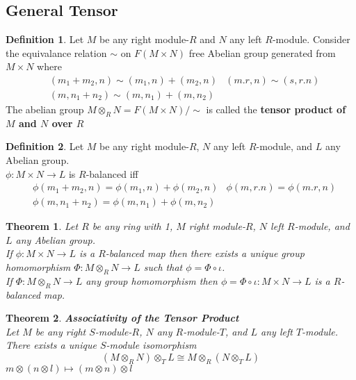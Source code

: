 \documentclass{article}
\theoremstyle{plain}
\newtheorem{thm}{Theorem}[section]
\theoremstyle{definition}
\newtheorem{defn}{Definition}[section]
\theoremstyle{remark}
\begin{document}
  \subsection{General Tensor}
  \begin{defn}
    Let $M$ be any right module-$R$ and $N$ any left $R$-module. Consider the
    equivalance relation $\sim$ on $F(M\times N)$ free Abelian group generated from
    $M\times N$ where
  \begin{align*}
    &(m_1+m_2,n)\sim(m_1,n) + (m_2,n)
    &(m.r,n)\sim(s,r.n) \\
    &(m,n_1+n_2)\sim(m,n_1)+(m,n_2)
  \end{align*}
  The abelian group $M\otimes_RN=F(M\times N)/\sim$ is called the \textbf{tensor product of $M$ and $N$ over $R$}
  \end{defn}
  \begin{defn}
    Let $M$ be any right module-$R$, $N$ any left $R$-module, and $L$ any 
    Abelian group.\\[1em]
    $\phi:M\times N\to L$ is $R$-balanced iff
    \begin{align*}
      &\phi(m_1+m_2,n)=\phi(m_1,n)+\phi(m_2,n)
      &\phi(m,r.n)=\phi(m.r,n) \\
      &\phi(m,n_1+n_2)=\phi(m,n_1)+\phi(m,n_2)
    \end{align*}
  \end{defn}
  \begin{thm}
    Let $R$ be any ring with 1, $M$ right module-$R$, $N$ left
    $R$-module, and $L$ any Abelian group. \\[1em]
    If $\phi:M\times N\to L$ is a $R$-balanced map then there exists a 
    unique group homomorphism $\Phi:M\otimes_RN\to L$ such that $\phi=\Phi\circ\iota$.\\[1em]
    If $\Phi:M\otimes_RN\to L$ any group homomorphism then 
    $\phi=\Phi\circ\iota:M\times N\to L$ is a $R$-balanced map.
  \end{thm}
  \begin{thm}\textbf{Associativity of the Tensor Product}\\
    Let $M$ be any right $S$-module-$R$, $N$ any $R$-module-$T$, and $L$
    any left $T$-module.
    \\[1em]
    There exists a unique $S$-module isomorphism
   \[ (M\otimes_RN)\otimes_TL\cong M\otimes_R(N\otimes_T L) \]
   $m\otimes(n\otimes l)\mapsto (m\otimes n)\otimes l$
  \end{thm}
\end{document}
